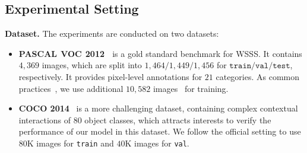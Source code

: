 \documentclass[10pt,twocolumn,letterpaper]{article}
\def\coco{COCO 2014}
\begin{document}
\subsection{Experimental Setting}\label{sec:settings}

\noindent\textbf{Dataset.} The experiments are conducted on two datasets:\!\!
\begin{itemize}[leftmargin=*]
	\setlength{\itemsep}{0pt}
	\setlength{\parsep}{-2pt}
	\setlength{\parskip}{-0pt}
	\setlength{\leftmargin}{-10pt}
\vspace{-6pt}\item \textbf{PASCAL$_{\!}$ VOC$_{\!}$ 2012$_{\!\!}$}~\cite{everingham2010pascal}$_{\!}$ is a gold standard benchmark for WSSS. It contains $4,\!369$ images, which are split into $1,\!464/1,\!449/1,\!456$ for $\texttt{train}/\texttt{val}/\texttt{test}$, respectively. It provides pixel-level annotations for $21$  categories. As common practices~\cite{huang2018weakly,lee2019ficklenet,zhang2020causal}, we use additional $10,\!582$ images~\cite{hariharan2011semantic} for training.
	
	\item \textbf{\coco}~\cite{lin2014microsoft}  is a more challenging dataset, containing complex contextual interactions of $80$ object classes, which attracts interests to verify the performance of our model in this dataset. We follow the official setting to use $80$K images for \texttt{train} and $40$K images for \texttt{val}. 
	\vspace{-4pt}
\end{itemize}



\newcommand{\demph}[1]{\textcolor{Gray}{#1}}
  \renewcommand{\hl}[1]{\textcolor{Highlight}{#1}}
  \newcommand{\reshl}[2]{
	\textbf{#1} \fontsize{7.5pt}{1em}\selectfont\color{mygreen}{$\uparrow$ \textbf{#2}}
}
\end{document}
